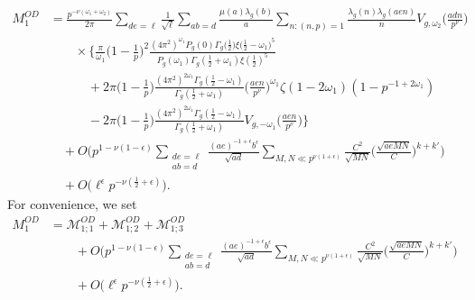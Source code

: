 \documentclass[12pt]{amsart}
\theoremstyle{plain}
\theoremstyle{definition}
\begin{document}
    \begin{align}\label{eq:M1OD residues} 
    M^{OD}_1
    &=  
    \frac{p^{-\nu(\omega_1+\omega_2)}}{2\pi}
    \sum_{de=\ell}
    \frac{1}{\sqrt{\ell}}
    \sum_{ab=d} \frac{\mu(a)  \lambda_g(b)}{a}
    \sum_{n: (n,p)=1}  \frac{\lambda_g(n)  \lambda_g(aen)}{n }
    V_{g, \omega_2} \Big(\frac{adn}{p^\nu }\Big)
  \nonumber  \\
    &\hspace{2em}\times \bigg\{
    \frac{\pi}{\omega_1}    \Big(1-\frac{1}{p}\Big)^2
    \frac{(4\pi^2)^{\omega_1}P_g(0) \Gamma_g\big(\frac12\big)  \xi\big(\frac12-\omega_1\big)^5}{P_g(\omega_1) \Gamma_g(\frac12+\omega_1) \xi(\frac12)^5}  
\nonumber    \\
    & \hspace{3em} + 2\pi   \Big(1-\frac{1}{p}\Big)
    \frac{(4\pi^2)^{2\omega_1}\Gamma_g(\frac12-\omega_1)}{\Gamma_g(\frac12+\omega_1) } 
    \Big(\frac{ ae n}{p^\nu}\Big)^{\omega_1} 
    \zeta(1-2\omega_1)  (1-p^{-1+2\omega_1})
  \nonumber  \\
    &\hspace{3em} -2\pi    \Big(1-\frac1{p}\Big)
    \frac{(4\pi^2)^{2\omega_1} \Gamma_g(\frac12-\omega_1)}{ \Gamma_g(\frac12+\omega_1) } 
    V_{g, -\omega_1}\Big(\frac{aen}{p^\nu}\Big) 
    \bigg\}
    \\&\hspace{1em} + O\bigg(p^{1-\nu(1-\epsilon)}
    \sum_{\substack{de=\ell\\ab=d}}  \frac{(ae)^{-1+\epsilon}b^{\epsilon}}{\sqrt{ad}}\sum_{M,N\ll p^{\nu(1+\epsilon)}}\frac{C^2}{\sqrt{MN}}\Big(\frac{\sqrt{aeMN}}{C}\Big)^{k+k'}\bigg)\nonumber
    \\&\hspace{1em}+O\Big(\ell^{\epsilon}p^{-\nu\left(\frac{1}{2}+\epsilon\right)}\Big) . \nonumber
   \end{align}
For convenience, we set
   \begin{align*}
   M^{OD}_1 &= \mathscr{M}^{OD}_{1;1} +\mathscr{M}^{OD}_{1;2}+\mathscr{M}^{OD}_{1;3}\\&\hspace{2em} 
   + O\bigg(p^{1-\nu(1-\epsilon)}
    \sum_{\substack{de=\ell\\ab=d}}  \frac{(ae)^{-1+\epsilon}b^{\epsilon}}{\sqrt{ad}}\sum_{M,N\ll p^{\nu(1+\epsilon)}}\frac{C^2}{\sqrt{MN}}\Big(\frac{\sqrt{aeMN}}{C}\Big)^{k+k'}\bigg)
    \\&\hspace{2em}+O\Big(\ell^{\epsilon}p^{-\nu\left(\frac{1}{2}+\epsilon\right)}\Big). 
 \end{align*}
\end{document}
